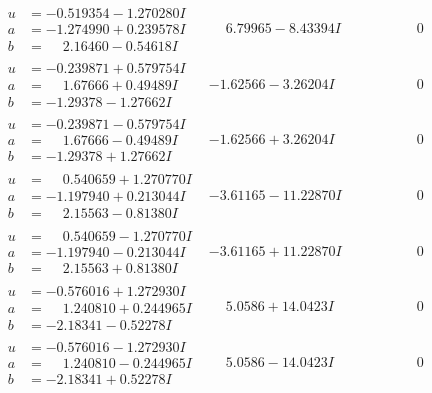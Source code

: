 \documentclass[1p]{elsarticle_modified}
\theoremstyle{definition}
\begin{document}
$$\begin{array}{c|c|c}
\begin{aligned}
u &= -0.519354 - 1.270280 I \\
a &= -1.274990 + 0.239578 I \\
b &= \phantom{-}2.16460 - 0.54618 I\end{aligned}
 & \phantom{-}6.79965 - 8.43394 I & \phantom{-0.000000 } 0 \\ \hline\begin{aligned}
u &= -0.239871 + 0.579754 I \\
a &= \phantom{-}1.67666 + 0.49489 I \\
b &= -1.29378 - 1.27662 I\end{aligned}
 & -1.62566 - 3.26204 I & \phantom{-0.000000 } 0 \\ \hline\begin{aligned}
u &= -0.239871 - 0.579754 I \\
a &= \phantom{-}1.67666 - 0.49489 I \\
b &= -1.29378 + 1.27662 I\end{aligned}
 & -1.62566 + 3.26204 I & \phantom{-0.000000 } 0 \\ \hline\begin{aligned}
u &= \phantom{-}0.540659 + 1.270770 I \\
a &= -1.197940 + 0.213044 I \\
b &= \phantom{-}2.15563 - 0.81380 I\end{aligned}
 & -3.61165 - 11.22870 I & \phantom{-0.000000 } 0 \\ \hline\begin{aligned}
u &= \phantom{-}0.540659 - 1.270770 I \\
a &= -1.197940 - 0.213044 I \\
b &= \phantom{-}2.15563 + 0.81380 I\end{aligned}
 & -3.61165 + 11.22870 I & \phantom{-0.000000 } 0 \\ \hline\begin{aligned}
u &= -0.576016 + 1.272930 I \\
a &= \phantom{-}1.240810 + 0.244965 I \\
b &= -2.18341 - 0.52278 I\end{aligned}
 & \phantom{-}5.0586 + 14.0423 I & \phantom{-0.000000 } 0 \\ \hline\begin{aligned}
u &= -0.576016 - 1.272930 I \\
a &= \phantom{-}1.240810 - 0.244965 I \\
b &= -2.18341 + 0.52278 I\end{aligned}
 & \phantom{-}5.0586 - 14.0423 I & \phantom{-0.000000 } 0\\

\end{array}$$
\end{document}
